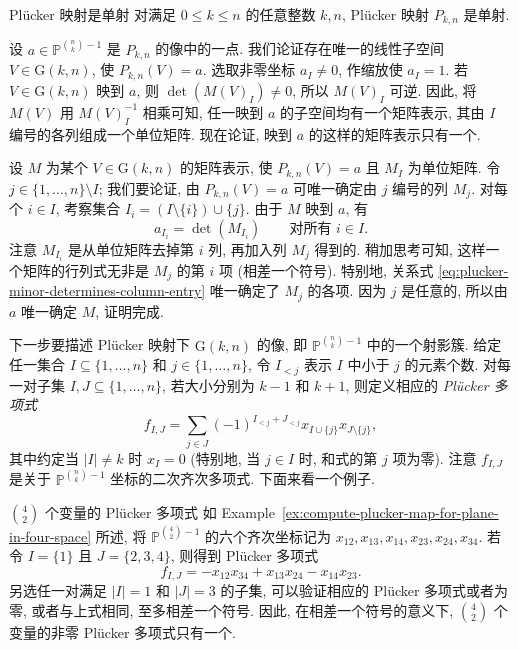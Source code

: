 \begin{Proposition}{Plücker 映射是单射}\leavevmode\label{prop:plucker-maps-are-injective}
对满足 $0\le k\le n$ 的任意整数 $k,n$, Plücker 映射 $P_{k,n}$ 是单射.
\end{Proposition}
\begin{Proof}
设 $a\in\mathbb{P}^{\binom{n}{k}-1}$ 是 $P_{k,n}$ 的像中的一点. 我们论证存在唯一的线性子空间 $V\in\mathrm{G}(k,n)$, 使 $P_{k,n}(V)=a$. 选取非零坐标 $a_{I}\ne0$, 作缩放使 $a_{I}=1$. 若 $V\in\mathrm{G}(k,n)$ 映到 $a$, 则 $\det(M(V)_{I})\ne0$, 所以 $M(V)_{I}$ 可逆. 因此, 将 $M(V)$ 用 $M(V)_{I}^{-1}$ 相乘可知, 任一映到 $a$ 的子空间均有一个矩阵表示, 其由 $I$ 编号的各列组成一个单位矩阵. 现在论证, 映到 $a$ 的这样的矩阵表示只有一个.

设 $M$ 为某个 $V\in\mathrm{G}(k,n)$ 的矩阵表示, 使 $P_{k,n}(V)=a$ 且 $M_{I}$ 为单位矩阵. 令 $j\in\{1,\ldots,n\}\setminus I$; 我们要论证, 由 $P_{k,n}(V)=a$ 可唯一确定由 $j$ 编号的列 $M_{j}$. 对每个 $i\in I$, 考察集合 $I_{i}=(I\setminus\{i\})\cup\{j\}$. 由于 $M$ 映到 $a$, 有
\begin{equation}\label{eq:plucker-minor-determines-column-entry}
  a_{I_{i}}=\det(M_{I_{i}})\qquad\text{对所有 }i\in I.
\end{equation}
注意 $M_{I_{i}}$ 是从单位矩阵去掉第 $i$ 列, 再加入列 $M_{j}$ 得到的. 稍加思考可知, 这样一个矩阵的行列式无非是 $M_{j}$ 的第 $i$ 项 (相差一个符号). 特别地, 关系式 \eqref{eq:plucker-minor-determines-column-entry} 唯一确定了 $M_{j}$ 的各项. 因为 $j$ 是任意的, 所以由 $a$ 唯一确定 $M$, 证明完成.
\end{Proof}

下一步要描述 Plücker 映射下 $\mathrm{G}(k,n)$ 的像, 即 $\mathbb{P}^{\binom{n}{k}-1}$ 中的一个射影簇. 给定任一集合 $I\subseteq\{1,\ldots,n\}$ 和 $j\in\{1,\ldots,n\}$, 令 $I_{<j}$ 表示 $I$ 中小于 $j$ 的元素个数. 对每一对子集 $I,J\subseteq\{1,\ldots,n\}$, 若大小分别为 $k-1$ 和 $k+1$, 则定义相应的 \emph{Plücker 多项式}
\begin{equation}\label{eq:plucker-polynomial-by-two-index-sets}
  f_{I,J}=\sum_{j\in J}(-1)^{I_{<j}+J_{<j}}x_{I\cup\{j\}}x_{J\setminus\{j\}},
\end{equation}
其中约定当 $|I|\ne k$ 时 $x_{I}=0$ (特别地, 当 $j\in I$ 时, 和式的第 $j$ 项为零). 注意 $f_{I,J}$ 是关于 $\mathbb{P}^{\binom{n}{k}-1}$ 坐标的二次齐次多项式. 下面来看一个例子.

\begin{Example}{$\binom{4}{2}$ 个变量的 Plücker 多项式}\leavevmode\label{ex:plucker-polynomial-in-six-variables}
如 Example~\ref{ex:compute-plucker-map-for-plane-in-four-space} 所述, 将 $\mathbb{P}^{\binom{4}{2}-1}$ 的六个齐次坐标记为 $x_{12},x_{13},x_{14},x_{23},x_{24},x_{34}$. 若令 $I=\{1\}$ 且 $J=\{2,3,4\}$, 则得到 Plücker 多项式
\[
  f_{I,J}=-x_{12}x_{34}+x_{13}x_{24}-x_{14}x_{23}.
\]
另选任一对满足 $|I|=1$ 和 $|J|=3$ 的子集, 可以验证相应的 Plücker 多项式或者为零, 或者与上式相同, 至多相差一个符号. 因此, 在相差一个符号的意义下, $\binom{4}{2}$ 个变量的非零 Plücker 多项式只有一个.
\end{Example}

